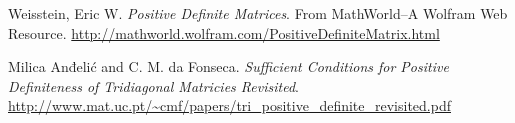 \documentclass[12pt]{article} %
\newcommand*{\1}{\mathbbm{1}}
\begin{document}
\begin{thebibliography}{3}

	Weisstein, Eric W.
	\textit{Positive Definite Matrices}. 
	From MathWorld--A Wolfram Web Resource. \url{http://mathworld.wolfram.com/PositiveDefiniteMatrix.html}
	
	Milica Anđelić and C. M. da Fonseca.
	\textit{Sufficient Conditions for Positive Definiteness of Tridiagonal Matricies Revisited}.
   \url{http://www.mat.uc.pt/~cmf/papers/tri_positive_definite_revisited.pdf}
    
\end{thebibliography}
\end{document}
